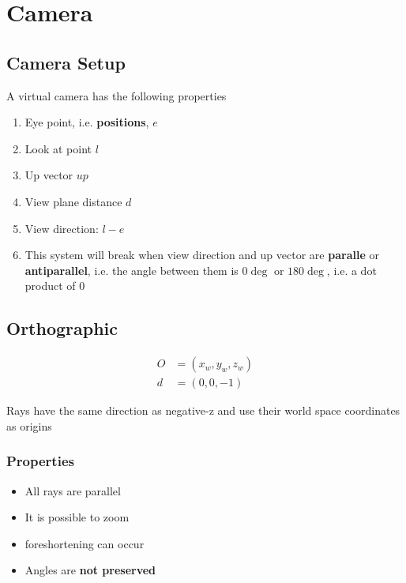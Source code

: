 \chapter{Camera}\label{chapter: camera}

\section{Camera Setup}

  A virtual camera has the following properties

  \begin{enumerate}
    \item Eye point, i.e. \textbf{positions}, $ e $
    \item Look at point $ l $
    \item Up vector $ up $
    \item View plane distance $ d $
    \item View direction: $ l - e $
    \item This system will break when view direction and up vector are
    \textbf{paralle} or \textbf{antiparallel}, i.e. the angle between them is
    $ 0\deg $ or $ 180\deg $, i.e. a dot product of $ 0 $
  \end{enumerate}

\section{Orthographic}

  \begin{align}
    O &= \left( x_{w}, y_{w}, z_{w} \right) \\
    d &= \left( 0, 0, -1 \right)
  \end{align}

  Rays have the same direction as negative-z and use their world space
  coordinates as origins

  \subsection{Properties}

    \begin{itemize}
      \item All rays are parallel
      \item It is possible to zoom
      \item \Gls{foreshortening} can occur
      \item Angles are \textbf{not preserved}
    \end{itemize}

